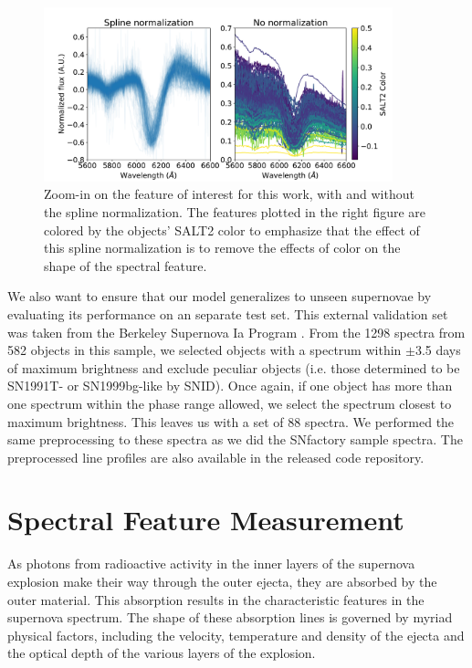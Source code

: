 \begin{figure}[htbp]
    \centering
    \includegraphics[width=0.9\textwidth]{figures/si_feat_pca/compare_spline_norm.pdf}
    \caption{Zoom-in on the feature of interest for this work, with and without the spline normalization. The features plotted in the right figure are colored by the objects' SALT2 color to emphasize that the effect of this spline normalization is to remove the effects of color on the shape of the spectral feature.}
    \label{compare_spline_norm}
\end{figure}

We also want to ensure that our model generalizes to unseen supernovae by evaluating its performance on an separate test set. This external validation set was taken from the Berkeley Supernova Ia Program \citep[BSNIP,][]{silverman_berkeley_2012}. From the 1298 spectra from 582 objects in this sample, we selected objects with a spectrum within $\pm$3.5 days of maximum brightness and exclude peculiar objects (i.e. those determined to be SN1991T- or SN1999bg-like by SNID). Once again, if one object has more than one spectrum within the phase range allowed, we select the spectrum closest to maximum brightness. This leaves us with a set of 88 spectra. We performed the same preprocessing to these spectra as we did the SNfactory sample spectra. The preprocessed line profiles are also available in the released code repository.

\section{Spectral Feature Measurement}
\label{spectral_features}
As photons from radioactive activity in the inner layers of the supernova explosion make their way through the outer ejecta, they are absorbed by the outer material. This absorption results in the characteristic features in the supernova spectrum. The shape of these absorption lines is governed by myriad physical factors, including the velocity, temperature and density of the ejecta and the optical depth of the various layers of the explosion.

